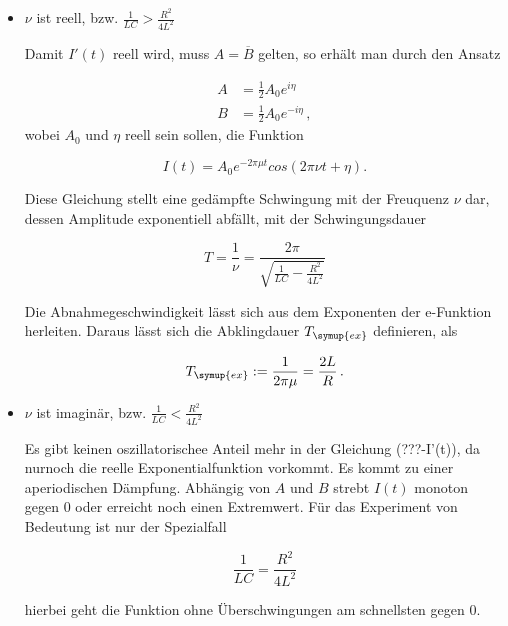 \begin{itemize}
  \item $\nu $ ist reell, bzw. $\frac{1}{LC} > \frac{R^2}{4L^2}$

  Damit $I'(t)$ reell wird, muss $A=\overline{B}$ gelten, so erhält man durch den Ansatz

  \begin{align*}
    A &= \frac{1}{2} A_0 e^{i \eta}\\
    B &= \frac{1}{2} A_0 e^{-i \eta} \, ,
  \end{align*}
  wobei $A_0$ und $\eta$ reell sein sollen, die Funktion

  \begin{equation*}
    I(t) = A_0 e^{-2 \pi \mu t} cos(2 \pi \nu t + \eta).
  \end{equation*}

  Diese Gleichung stellt eine gedämpfte Schwingung mit der Freuquenz $\nu$ dar, dessen Amplitude exponentiell
  abfällt, mit der Schwingungsdauer

  \begin{equation*}
    T = \frac{1}{\nu} = \frac{2 \pi}{\sqrt{\frac{1}{LC} - \frac{R^2}{4L^2}}}
  \end{equation*}

  Die Abnahmegeschwindigkeit lässt sich aus dem Exponenten der e-Funktion herleiten. Daraus lässt sich
  die Abklingdauer $T_{\symup{ex}}$ definieren, als

  \begin{equation}
    T_{\symup{ex}} := \frac{1}{2 \pi \mu} = \frac{2L}{R} \, .
  \end{equation}

  \item $\nu $ ist imaginär, bzw. $\frac{1}{LC} < \frac{R^2}{4L^2}$

  Es gibt keinen oszillatorischee Anteil mehr in der Gleichung (???-I'(t)), da nurnoch die reelle
  Exponentialfunktion vorkommt. Es kommt zu einer aperiodischen Dämpfung. Abhängig von $A$ und $B$ strebt
  $I(t)$ monoton gegen 0 oder erreicht noch einen Extremwert. Für das Experiment von Bedeutung ist nur
  der Spezialfall

  \begin{equation}
    \frac{1}{LC} = \frac{R^2}{4L^2}
  \end{equation}

  hierbei geht die Funktion ohne Überschwingungen am schnellsten gegen 0.

\end{itemize}

